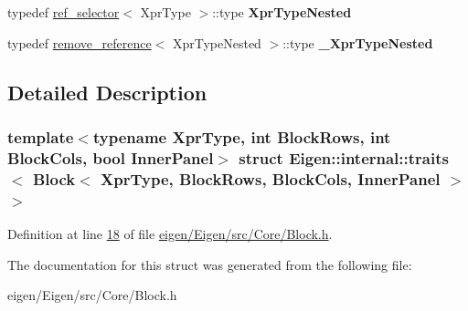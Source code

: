 \begin{DoxyCompactItemize}
\item 
\mbox{\label{struct_eigen_1_1internal_1_1traits_3_01_block_3_01_xpr_type_00_01_block_rows_00_01_block_cols_00_01_inner_panel_01_4_01_4_a96124deb6958890f2c5f8c61be968bdb}} 
typedef \hyperlink{struct_eigen_1_1internal_1_1ref__selector}{ref\+\_\+selector}$<$ Xpr\+Type $>$\+::type {\bfseries Xpr\+Type\+Nested}
\item 
\mbox{\label{struct_eigen_1_1internal_1_1traits_3_01_block_3_01_xpr_type_00_01_block_rows_00_01_block_cols_00_01_inner_panel_01_4_01_4_a1c896000aee288fc9246704dea823cd8}} 
typedef \hyperlink{struct_eigen_1_1internal_1_1remove__reference}{remove\+\_\+reference}$<$ Xpr\+Type\+Nested $>$\+::type {\bfseries \+\_\+\+Xpr\+Type\+Nested}
\end{DoxyCompactItemize}


\subsection{Detailed Description}
\subsubsection*{template$<$typename Xpr\+Type, int Block\+Rows, int Block\+Cols, bool Inner\+Panel$>$\newline
struct Eigen\+::internal\+::traits$<$ Block$<$ Xpr\+Type, Block\+Rows, Block\+Cols, Inner\+Panel $>$ $>$}



Definition at line \hyperlink{eigen_2_eigen_2src_2_core_2_block_8h_source_l00018}{18} of file \hyperlink{eigen_2_eigen_2src_2_core_2_block_8h_source}{eigen/\+Eigen/src/\+Core/\+Block.\+h}.



The documentation for this struct was generated from the following file\+:\begin{DoxyCompactItemize}
\item 
eigen/\+Eigen/src/\+Core/\+Block.\+h\end{DoxyCompactItemize}
